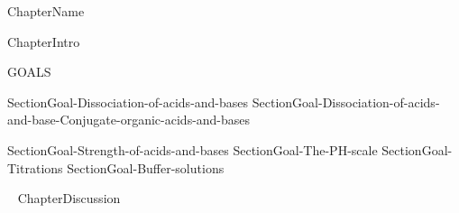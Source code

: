 \documentclass[main.tex]{subfiles}
\newcommand\chapterlabel{Ch-acidbase}\setcounter{figurenewcounter}{0}\setcounter{tablenewcounter}{0}\setcounter{formulanewcounter}{0}
\begin{document}
  {ChapterName}
       \begin{marginfigure}
\end{marginfigure}
   
  {ChapterIntro}
\begin{marginfigure}%
\begin{mytcbox}{GOALS}
\begin{enumerate}[label=\protect\circled{\color{white}\arabic*}]

{SectionGoal-Dissociation-of-acids-and-bases}
{SectionGoal-Dissociation-of-acids-and-base-Conjugate-organic-acids-and-bases}

{SectionGoal-Strength-of-acids-and-bases}
{SectionGoal-The-PH-scale}
{SectionGoal-Titrations}
{SectionGoal-Buffer-solutions}

\end{enumerate}
\end{mytcbox}
\vspace{1cm}
\begin{tcolorbox}[enhanced,colback=red!5!white,colframe=black!50!red,boxrule=1pt,
  arc=0pt,outer arc=0pt,drop heavy lifted shadow]
\faGears\ 
   {ChapterDiscussion}
\end{tcolorbox}
\end{marginfigure}%
\end{document}

